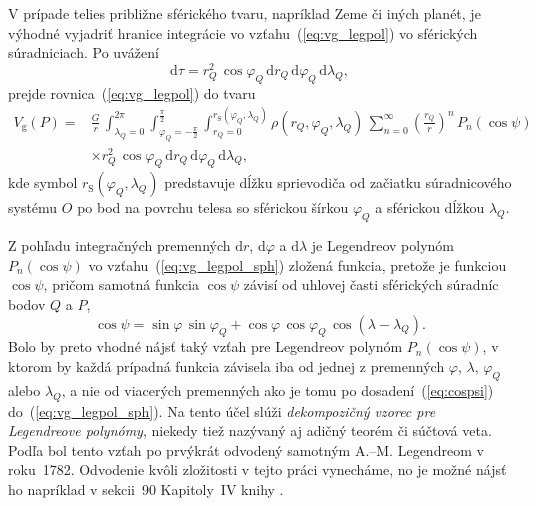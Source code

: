 \documentclass[a4paper, 12pt]{book}
\newcommand{\diff}{\mathrm d}
\newcommand{\gidx}{\mathrm g}
\begin{document}
V prípade telies približne sférického tvaru, napríklad Zeme či iných planét, je 
výhodné vyjadriť hranice integrácie vo vzťahu~(\ref{eq:vg_legpol}) vo 
sférických súradniciach.  Po uvážení
%
\begin{equation}
\diff \tau = r_Q^2 \, \cos\varphi_Q \, \diff r_Q \, \diff\varphi_Q \, 
\diff\lambda_Q{,}
\end{equation}
%
prejde rovnica~(\ref{eq:vg_legpol}) do tvaru
%
\begin{equation}
\label{eq:vg_legpol_sph}
\begin{split}
V_\gidx(P) =& \frac{G}{r} \, \int_{\lambda_Q = 0}^{2\pi} \int_{\varphi_Q 
= -\frac{\pi}{2}}^{\frac{\pi}{2}} \int_{r_Q = 0}^{r_{\mathrm{S}}(\varphi_Q, 
\lambda_Q)} \rho(r_Q, \varphi_Q, \lambda_Q) \, \sum_{n = 0}^{\infty} \left( 
\frac{r_Q}{r} \right)^n \, P_n(\cos\psi)\\
%
&\times r_Q^2 \, \cos\varphi_Q \, \diff r_Q \, \diff\varphi_Q \, 
\diff\lambda_Q{,}
\end{split}
\end{equation}
%
kde symbol $r_\mathrm{S}(\varphi_Q, \lambda_Q)$ predstavuje dĺžku sprievodiča 
od začiatku súradnicového systému $O$ po bod na povrchu telesa so sférickou 
šírkou $\varphi_Q$ a sférickou dĺžkou $\lambda_Q$.

Z pohľadu integračných premenných $\diff r$, $\diff\varphi$ a $\diff\lambda$ je 
Legendreov polynóm $P_n(\cos\psi)$ vo vzťahu~(\ref{eq:vg_legpol_sph}) zložená 
funkcia, pretože je funkciou $\cos\psi$, pričom samotná funkcia $\cos\psi$ 
závisí od uhlovej časti sférických súradníc bodov $Q$ a $P$,
%
\begin{equation}
\label{eq:cospsi}
\cos\psi = \sin\varphi \, \sin\varphi_Q + \cos\varphi \, \cos\varphi_Q \, 
\cos(\lambda - \lambda_Q){.}
\end{equation}
%
Bolo by preto vhodné nájsť taký vzťah pre Legendreov polynóm $P_n(\cos\psi)$, 
v ktorom by každá prípadná funkcia závisela iba od jednej z premenných 
$\varphi$, $ \lambda$, $\varphi_Q$ alebo $\lambda_Q$, a nie od viacerých 
premenných ako je tomu po dosadení~(\ref{eq:cospsi}) 
do~(\ref{eq:vg_legpol_sph}).  Na tento účel slúži \emph{dekompozičný vzorec pre 
Legendreove polynómy}, niekedy tiež nazývaný aj adičný teorém či súčtová veta.  
Podľa \cite{Hobson} bol tento vzťah po prvýkrát odvodený samotným 
A.--M. Legendreom v roku~1782.  Odvodenie kvôli zložitosti v tejto práci 
vynecháme, no je možné nájsť ho napríklad v sekcii~90 Kapitoly~IV knihy 
\cite{Hobson}.
\end{document}
